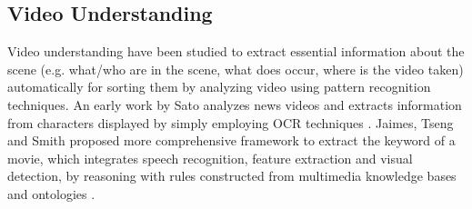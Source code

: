 \subsection{Video Understanding}

Video understanding have been studied to extract essential information about the scene (e.g. what/who are in the scene, what does occur, where is the video taken) automatically for sorting them by analyzing video using pattern recognition techniques.
An early work by Sato analyzes news videos and extracts information from characters displayed by simply employing OCR techniques \cite{sato1998video}.
Jaimes, Tseng and Smith proposed more comprehensive framework to extract the keyword of a movie, which integrates speech recognition, feature extraction and visual detection, by reasoning with rules constructed from multimedia knowledge bases and ontologies \cite{jaimes2003modal}.

